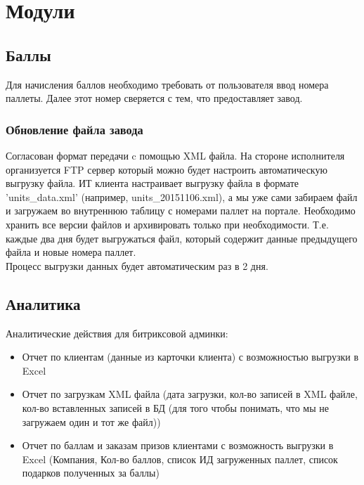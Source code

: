 \documentclass[DIV=calc, paper=a4, fontsize=11pt]{scrartcl} %
\begin{document}
\section{Модули}

\subsection{Баллы}

Для начисления баллов необходимо требовать от пользователя ввод номера паллеты. Далее этот номер сверяется с тем, что предоставляет завод.

\subsubsection{Обновление файла завода}

Согласован формат передачи c помощью XML файла. На стороне исполнителя организуется FTP сервер который можно будет настроить автоматическую выгрузку файла. ИТ клиента настраивает выгрузку файла в формате 'units\_data.xml' (например, units\_20151106.xml), а мы уже сами забираем файл и загружаем во внутреннюю таблицу с номерами паллет на портале. Необходимо хранить все версии файлов и архивировать только при необходимости. Т.е. каждые два дня будет выгружаться файл, который содержит данные предыдущего файла и новые номера паллет.
\\[0.5cm]
Процесс выгрузки данных будет автоматическим раз в 2 дня.

\subsection{Аналитика}

Аналитические действия для битриксовой админки:

\begin{itemize}
	\item Отчет по клиентам (данные из карточки клиента) с возможностью выгрузки в Excel
	\item Отчет по загрузкам XML файла (дата загрузки, кол-во записей в XML файле, кол-во вставленных записей в БД (для того чтобы понимать, что мы не загружаем один и тот же файл))
	\item Отчет по баллам и заказам призов клиентами с возможность выгрузки в Excel (Компания, Кол-во баллов, список ИД  загруженных паллет, список подарков полученных за баллы)

\end{itemize}
\end{document}
